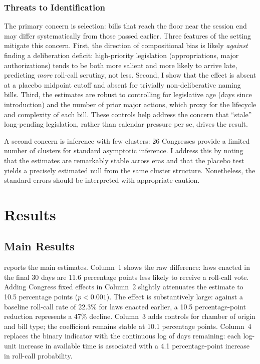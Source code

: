 \documentclass[12pt]{article}
\begin{document}
\subsubsection*{Threats to Identification} The primary concern is selection: bills that reach the floor near the session end may differ systematically from those passed earlier. Three features of the setting mitigate this concern. First, the direction of compositional bias is likely \textit{against} finding a deliberation deficit: high-priority legislation (appropriations, major authorizations) tends to be both more salient and more likely to arrive late, predicting \textit{more} roll-call scrutiny, not less. Second, I show that the effect is absent at a placebo midpoint cutoff and absent for trivially non-deliberative naming bills. Third, the estimates are robust to controlling for legislative age (days since introduction) and the number of prior major actions, which proxy for the lifecycle and complexity of each bill. These controls help address the concern that ``stale'' long-pending legislation, rather than calendar pressure per se, drives the result.

A second concern is inference with few clusters: 26 Congresses provide a limited number of clusters for standard asymptotic inference. I address this by noting that the estimates are remarkably stable across eras and that the placebo test yields a precisely estimated null from the same cluster structure. Nonetheless, the standard errors should be interpreted with appropriate caution.


\section{Results}

\subsection{Main Results}



 reports the main estimates. Column~1 shows the raw difference: laws enacted in the final 30 days are 11.6 percentage points less likely to receive a roll-call vote. Adding Congress fixed effects in Column~2 slightly attenuates the estimate to 10.5 percentage points ($p < 0.001$). The effect is substantively large: against a baseline roll-call rate of 22.3\% for laws enacted earlier, a 10.5 percentage-point reduction represents a 47\% decline. Column~3 adds controls for chamber of origin and bill type; the coefficient remains stable at 10.1 percentage points. Column~4 replaces the binary indicator with the continuous log of days remaining: each log-unit increase in available time is associated with a 4.1 percentage-point increase in roll-call probability.
\end{document}

